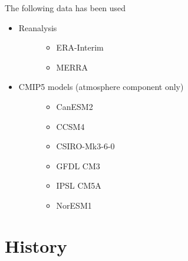 \documentclass[a4paper]{article}
\begin{document}
The following data has been used
%
\begin{itemize}

\item %
\begin{description}
\item[{Reanalysis}] \leavevmode %
\begin{itemize}

\item ERA-Interim

\item MERRA

\end{itemize}

\end{description}

\item %
\begin{description}
\item[{CMIP5 models (atmosphere component only)}] \leavevmode %
\begin{itemize}

\item CanESM2

\item CCSM4

\item CSIRO-Mk3-6-0

\item GFDL CM3

\item IPSL CM5A

\item NorESM1

\end{itemize}

\end{description}

\end{itemize}


\section{History%
  \label{history}%
}
\end{document}
